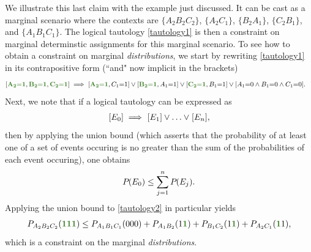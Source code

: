 {We illustrate this last claim with the example just discussed.  It can be cast as a marginal scenario where the contexts are $\{A_2 B_2 C_2\}$, $\{A_2 C_1\}$, $\{B_2 A_1\}$, $\{C_2 B_1\}$, and  $\{A_1 B_1 C_1\}$.  The logical tautology \eqref{tautology1} is then a constraint on marginal determinstic  assignments for this marginal scenario.   To see how to obtain a constraint on marginal {\em distributions}, we start by rewriting \cref{tautology1} in its contrapositive form (``and" now implicit in the brackets)
\begin{align}\begin{split}\label{tautology2}
&[\mgreen{A_2 \eql 1} , \mgreen{B_2 \eql 1} , \mgreen{C_2 \eql 1}]  \implies [\mgreen{A_2 \eql 1}, C_1 \eql 1] \lor  [\mgreen{B_2 \eql 1}, A_1 \eql 1] \lor  [\mgreen{C_2 \eql 1}, B_1 \eql 1] \lor  [A_1 \eql 0 \land B_1 \eql 0 \land C_1 \eql 0].
\end{split}\end{align}
Next, we note that if a logical tautology can be expressed as
\begin{align}\label{eq:inference}
    {\operatorname{\mathsf{}}_{}}\lbrack E_0\rbrack \implies {\operatorname{\mathsf{}}_{}}\lbrack E_1\rbrack \lor \ldots \lor {\operatorname{\mathsf{}}_{}}\lbrack E_n\rbrack,
\end{align}
then by applying the union bound (which asserts that the probability of at least one of a set of events occuring is no greater than the sum of the probabilities of each event occuring), 
 one obtains
\begin{align}\label{eq:possinference}
{P_{}}\lparen E_0\rparen\leq \sum\limits_{j=1}^n{{P_{}}\lparen E_j\rparen}.
\end{align}
Applying the union bound to \cref{tautology2} in particular yields
\begin{align}\label{eq:F3rawweak}
P_{A_2 B_2 C_2}\parens{\mgreen{1} \mgreen{1} \mgreen{1}} \leq P_{A_1 B_1 C_1}\parens{0 0 0}+P_{A_1 B_2}\parens{1 \mgreen{1 }}+P_{ B_1 C_2}\parens{ 1 \mgreen{1}}+P_{A_2 C_1}\parens{\mgreen{1 } 1},
\end{align}
which is a constraint on the marginal {\em distributions}.
 
}
